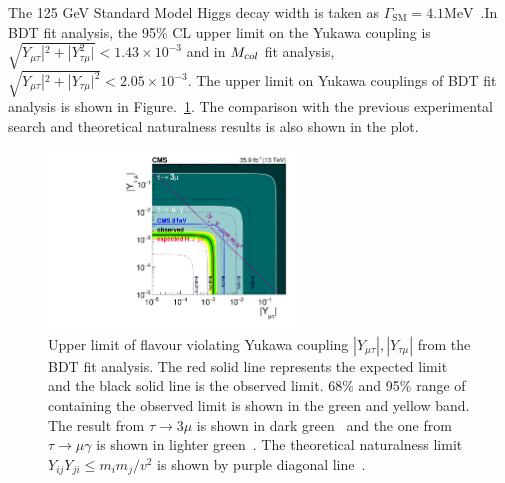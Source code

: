 The 125 GeV Standard Model Higgs  decay width is taken as $\Gamma_{\mathrm{SM}}=4.1\textrm{MeV}$~\cite{Denner:2011mq}.In BDT fit analysis, the 95\% CL upper limit on the Yukawa coupling is $\sqrt{Y_{\mu\tau}|^2 + |Y_{\tau\mu}^2|}<1.43\times 10^{-3}$ and in $M_{col}$ fit analysis, $\sqrt{Y_{\mu\tau}|^2 + |Y_{\tau\mu}|^2}<2.05\times 10^{-3}$. The upper limit on Yukawa couplings of BDT fit analysis is shown in Figure.~\ref{fig:Yukawas}. The comparison with the previous experimental search and theoretical naturalness results is also shown in the plot. 





\begin{figure}[htpb]
\begin{center}
\includegraphics[width=0.6\textwidth]{chapter8/yukawaMuon_dark.pdf}
\end{center}
\caption{Upper limit of flavour violating Yukawa coupling $|Y_{\mu\tau}|, |Y_{\tau\mu}|$ from the BDT fit analysis. The red solid line represents the expected limit and the black solid line is the observed limit. 68\% and 95\% range of containing the observed limit is shown in the green and yellow band. The result from $\tau \to 3 \mu$ is shown in dark green~\cite{Hayasaka:2010np,Olive:2016xmw,Harnik:2012pb} and the one from $\tau \to \mu\gamma$ is shown in lighter green~\cite{Olive:2016xmw,Harnik:2012pb}. The theoretical naturalness limit $Y_{ij}Y_{ji} \leq m_im_j/v^2$ is shown by purple diagonal line~\cite{Harnik:2012pb}.}

\label{fig:Yukawas}
\end{figure}









